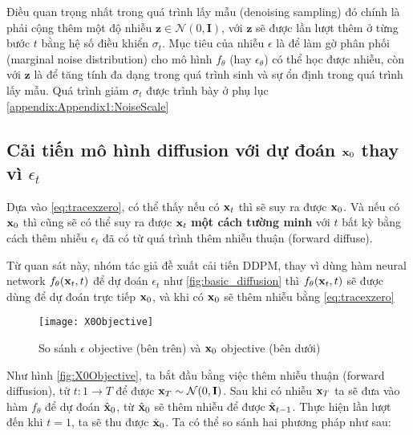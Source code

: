 Điều quan trọng nhất trong quá trình lấy mẫu (denoising sampling) đó chính là phải cộng thêm một độ nhiễu $\mathbf{z} \in \mathcal{N}(0, \mathbf{I})$, với $\mathbf{z}$  sẽ được lần lượt thêm ở từng bước $t$ bằng hệ số điều khiển $\sigma_t$. Mục tiêu của nhiễu $\epsilon$ là để  làm gờ phân phối (marginal noise distribution) cho mô hình $f_\theta$ (hay $\epsilon_{\theta}$) có thể học được nhiễu, còn với  $\mathbf{z}$ là để tăng tính đa dạng trong quá trình sinh và sự ổn định trong quá trình lấy mẫu. Quá trình giảm $\sigma_t$ được trình bày ở phụ lục \autoref{appendix:Appendix1:NoiseScale}


\subsection{Cải tiến mô hình diffusion với dự đoán $\mathbf{x}_0$ thay vì $\epsilon_t$}
\label{subsec:X0Objective}

Dựa vào \autoref{eq:tracexzero}, có thể thấy nếu có $\mathbf{x}_{t}$ thì sẽ suy ra được $\mathbf{x}_0$. Và nếu có $\mathbf{x}_0$ thì cũng sẽ có thể suy ra được $\mathbf{x}_{t}$ \textbf{một cách tường minh} với $t$ bất kỳ bằng cách thêm nhiễu $\epsilon_t$ đã có từ quá trình thêm nhiễu thuận (forward diffuse).

Từ quan sát này, nhóm tác giả \cite{nichol2021improved} đề xuất cải tiến DDPM, thay vì dùng hàm neural network $f_{\theta}(\mathbf{x}_t, t)$ để dự đoán $\epsilon_t$ như \autoref{fig:basic_diffusion} thì $f_{\theta}(\mathbf{x}_t, t)$ sẽ được dùng để dự đoán trực tiếp $\mathbf{x}_0$, và khi có $\mathbf{x}_0$ sẽ thêm nhiễu bằng  \autoref{eq:tracexzero}


\begin{figure}[H]
	\captionsetup{skip=2pt}
	\texttt{[image: X0Objective]}
	\caption{So sánh $\epsilon$ objective (bên trên) và  $\mathbf{x}_0$ objective (bên dưới)}
	\label{fig:X0Objective}
\end{figure}

Như hình \autoref{fig:X0Objective}, ta bắt đầu bằng việc thêm nhiễu thuận (forward diffusion), từ $t: 1 \rightarrow T$ để được $\mathbf{x}_T \sim \mathcal{N} (0, \mathbf{I})$. Sau khi có nhiễu $\mathbf{x}_{T}$ ta sẽ đưa vào hàm $f_{\theta}$ để dự đoán $\hat{\mathbf{x}}_0$, từ $\hat{\mathbf{x}}_0$ sẽ thêm nhiễu để được $\hat{\mathbf{x}}_{t-1}$. Thực hiện lần lượt đến khi $t = 1$, ta sẽ thu được $\hat{\mathbf{x}}_0$. Ta có thể so sánh hai phương pháp như sau:


